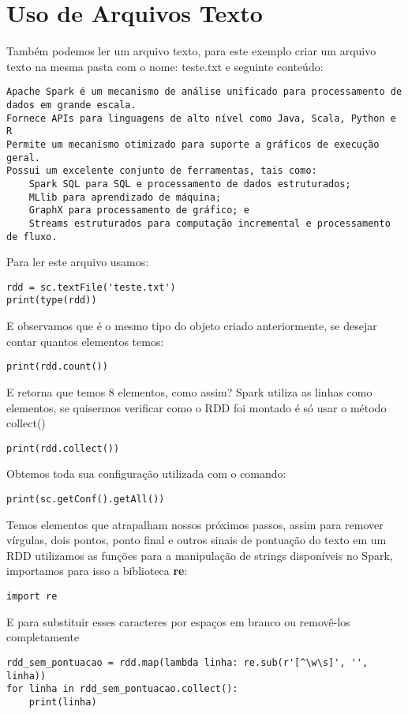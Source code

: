 \section{Uso de Arquivos Texto}
Também podemos ler um arquivo texto, para este exemplo criar um arquivo texto na mesma pasta com o nome: teste.txt e seguinte conteúdo:
\begin{lstlisting}[]
Apache Spark é um mecanismo de análise unificado para processamento de dados em grande escala.
Fornece APIs para linguagens de alto nível como Java, Scala, Python e R
Permite um mecanismo otimizado para suporte a gráficos de execução geral.
Possui um excelente conjunto de ferramentas, tais como:
    Spark SQL para SQL e processamento de dados estruturados;
    MLlib para aprendizado de máquina;
    GraphX para processamento de gráfico; e
    Streams estruturados para computação incremental e processamento de fluxo.
\end{lstlisting}

Para ler este arquivo usamos:
\begin{lstlisting}[]
rdd = sc.textFile('teste.txt')
print(type(rdd))
\end{lstlisting}

E observamos que é o mesmo tipo do objeto criado anteriormente, se desejar contar quantos elementos temos:
\begin{lstlisting}[]
print(rdd.count())
\end{lstlisting}

E retorna que temos 8 elementos, como assim? Spark utiliza as linhas como elementos, se quisermos verificar como o RDD foi montado é só usar o método collect()
\begin{lstlisting}[]
print(rdd.collect())
\end{lstlisting}

Obtemos toda sua configuração utilizada com o comando:
\begin{lstlisting}[]
print(sc.getConf().getAll())
\end{lstlisting}

Temos elementos que atrapalham nossos próximos passos, assim para remover vírgulas, dois pontos, ponto final e outros sinais de pontuação do texto em um RDD utilizamos as funções para a manipulação de strings disponíveis no Spark, importamos para isso a biblioteca \textbf{re}:
\begin{lstlisting}[]
import re
\end{lstlisting}

E para substituir esses caracteres por espaços em branco ou removê-los completamente
\begin{lstlisting}[]
rdd_sem_pontuacao = rdd.map(lambda linha: re.sub(r'[^\w\s]', '', linha))
for linha in rdd_sem_pontuacao.collect():
    print(linha)
\end{lstlisting}

